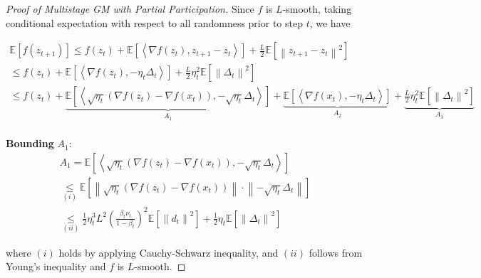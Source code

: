 \begin{proof}[Proof of Multistage GM with Partial Participation]
Since $f$ is $L$-smooth, taking conditional expectation with respect to all randomness prior to step $t$, we have

\begin{equation}
\begin{gathered}
\mathbb{E}\left[f(z_{t+1})\right] \leq f(z_t)+\mathbb{E}\left[\left\langle \nabla f(z_t),z_{t+1}-z_t \right\rangle \right] + \frac{L}{2}\mathbb{E}\left[\left\| z_{t+1}-z_t \right\|^2\right]\\
\leq f(z_t)+\mathbb{E}\left[\left\langle \nabla f(z_t),-\eta_t \Delta_t \right\rangle\right] + \frac{L}{2}\eta_t^2\mathbb{E}\left[\left\| \Delta_t \right\|^2\right]\\
\leq f(z_t)+ \underbrace{\mathbb{E}\left[\left\langle \sqrt{\eta_t} \left(\nabla f(z_t)-\nabla f(x_t)\right),-\sqrt{\eta_t} \Delta_t \right\rangle\right]}_{A_1} + \underbrace{\mathbb{E}\left[\left\langle \nabla f(x_t),-\eta_t \Delta_t \right\rangle\right]}_{A_2} + \underbrace{\frac{L}{2}\eta_t^2\mathbb{E}\left[\left\| \Delta_t \right\|^2\right]}_{A_3} \\
\end{gathered}\nonumber
\end{equation}

\textbf{Bounding} $A_1$:
\begin{equation}
\begin{gathered}
A_1 =\mathbb{E}\left[\left\langle \sqrt{\eta_t} \left(\nabla f(z_t)-\nabla f(x_t)\right),-\sqrt{\eta_t} \Delta_t \right\rangle\right]\\
\underset{(i)}{\leq}\mathbb{E}\left[\left\| \sqrt{\eta_t} \left(\nabla f(z_t)-\nabla f(x_t)\right) \right\| \cdot \left\| -\sqrt{\eta_t} \Delta_t\right\|\right]\\
\underset{(ii)}{\leq} \frac{1}{2}\eta_t^3L^2\left(\frac{\beta_t\nu_t}{1-\beta_t}\right)^2\mathbb{E}\left[\left\| d_t\right\|^2\right] + \frac{1}{2}\eta_t\mathbb{E}\left[\left\| \Delta_t \right\|^2 \right]
\end{gathered}
\end{equation}

where $(i)$ holds by applying Cauchy-Schwarz inequality, and $(ii)$ follows from Young’s inequality and $f$ is $L$-smooth.


\end{proof}
